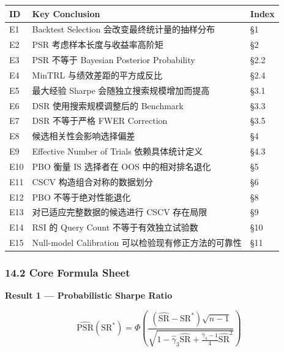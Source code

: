 \begin{readertable}
\begin{longtable}[]{@{}
  >{\raggedright\arraybackslash}p{}
  >{\raggedright\arraybackslash}p{}
  >{\raggedright\arraybackslash}p{}@{}}
\toprule
ID & Key Conclusion & Index \\
\midrule
\endhead
E1 & Backtest Selection 会改变最终统计量的抽样分布 & §1 \\
E2 & PSR 考虑样本长度与收益率高阶矩 & §2 \\
E3 & PSR 不等于 Bayesian Posterior Probability & §2.2 \\
E4 & MinTRL 与绩效差距的平方成反比 & §2.4 \\
E5 & 最大经验 Sharpe 会随独立搜索规模增加而提高 & §3.1 \\
E6 & DSR 使用搜索规模调整后的 Benchmark & §3.3 \\
E7 & DSR 不等于严格 FWER Correction & §3.5 \\
E8 & 候选相关性会影响选择偏差 & §4 \\
E9 & Effective Number of Trials 依赖具体统计定义 & §4.3 \\
E10 & PBO 衡量 IS 选择者在 OOS 中的相对排名退化 & §5 \\
E11 & CSCV 构造组合对称的数据划分 & §6 \\
E12 & PBO 不等于绝对性能退化 & §8 \\
E13 & 对已适应完整数据的候选进行 CSCV 存在局限 & §9 \\
E14 & RSI 的 Query Count 不等于有效独立试验数 & §10 \\
E15 & Null-model Calibration 可以检验现有修正方法的可靠性 & §11 \\
\bottomrule
\end{longtable}
\end{readertable}

\hypertarget{part-4-71-0001-core-formula-sheet}{%
\subsubsection{14.2 Core Formula Sheet}\label{part-4-71-0001-core-formula-sheet}}

\textbf{Result 1 --- Probabilistic Sharpe Ratio}

\[\boxed{
\widehat{\mathrm{PSR}}(\mathrm{SR}^*)
=
\Phi\left(
\frac{
(\widehat{\mathrm{SR}}-\mathrm{SR}^*)\sqrt{n-1}
}{
\sqrt{
1-\hat\gamma_3\widehat{\mathrm{SR}}
+
\frac{\hat\gamma_4-1}{4}\widehat{\mathrm{SR}}^2
}
}
\right)
}\]

